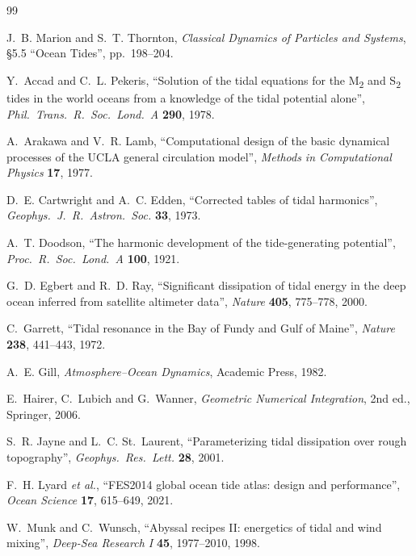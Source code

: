 \documentclass[11pt,a4paper,oneside]{report}
\renewcommand{\bibname}{Referências}
\theoremstyle{definition}
\theoremstyle{plain}
\theoremstyle{remark}
\begin{document}
\begin{thebibliography}{99}
\addcontentsline{toc}{chapter}{\bibname}

 J.~B. Marion and S.~T. Thornton,
\emph{Classical Dynamics of Particles and Systems}, \S5.5 ``Ocean Tides'',
pp.~198--204.

 Y.~Accad and C.~L. Pekeris,
``Solution of the tidal equations for the M\textsubscript{2} and
S\textsubscript{2} tides in the world oceans from a knowledge of the tidal
potential alone'', \emph{Phil.\ Trans.\ R.\ Soc.\ Lond.\ A} \textbf{290}, 1978.

 A.~Arakawa and V.~R. Lamb,
``Computational design of the basic dynamical processes of the UCLA general
circulation model'', \emph{Methods in Computational Physics} \textbf{17}, 1977.

 D.~E. Cartwright and A.~C. Edden,
``Corrected tables of tidal harmonics'',
\emph{Geophys.\ J.\ R.\ Astron.\ Soc.} \textbf{33}, 1973.

 A.~T. Doodson,
``The harmonic development of the tide-generating potential'',
\emph{Proc.\ R.\ Soc.\ Lond.\ A} \textbf{100}, 1921.

 G.~D. Egbert and R.~D. Ray,
``Significant dissipation of tidal energy in the deep ocean inferred from
satellite altimeter data'', \emph{Nature} \textbf{405}, 775--778, 2000.

 C.~Garrett,
``Tidal resonance in the Bay of Fundy and Gulf of Maine'',
\emph{Nature} \textbf{238}, 441--443, 1972.

 A.~E. Gill,
\emph{Atmosphere--Ocean Dynamics}, Academic Press, 1982.

 E.~Hairer, C.~Lubich and G.~Wanner,
\emph{Geometric Numerical Integration}, 2nd ed., Springer, 2006.

 S.~R. Jayne and L.~C. St.~Laurent,
``Parameterizing tidal dissipation over rough topography'',
\emph{Geophys.\ Res.\ Lett.} \textbf{28}, 2001.

 F.~H. Lyard \emph{et al.},
``FES2014 global ocean tide atlas: design and performance'',
\emph{Ocean Science} \textbf{17}, 615--649, 2021.

 W.~Munk and C.~Wunsch,
``Abyssal recipes II: energetics of tidal and wind mixing'',
\emph{Deep-Sea Research I} \textbf{45}, 1977--2010, 1998.


\end{thebibliography}
\end{document}
